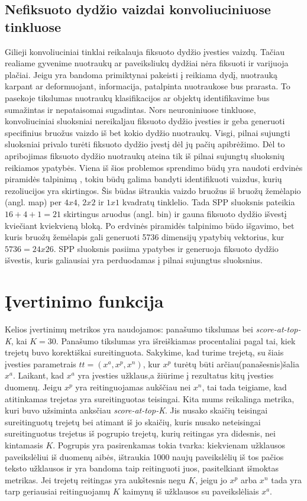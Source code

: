 \documentclass{VUMIFPSkursinis}
\DeclareRobustCommand{\[}{\begin{equation}}
\DeclareRobustCommand{\]}{\end{equation}}
\begin{document}
\subsection{Nefiksuoto dydžio vaizdai konvoliuciniuose tinkluose}
Gilieji konvoliuciniai tinklai reikalauja fiksuoto dydžio įvesties vaizdų. Tačiau realiame gyvenime nuotraukų ar paveiksliukų dydžiai nėra fiksuoti ir varijuoja plačiai.
\newline
Jeigu yra bandoma primiktynai pakeisti į reikiama dydį, nuotrauką karpant ar deformuojant, informacija, patalpinta nuotraukose bus prarasta. To pasekoje tikslumas nuotraukų klasifikacijos ar objektų identifikavime bus sumažintas ir nepataisomai sugadintas. Nors neuroniniuose tinkluose, konvoliuciniai sluoksniai nereikaljau fiksuoto dydžio įvesties ir geba generuoti specifinius bruožus vaizdo iš bet kokio dydžio nuotraukų. Visgi, pilnai sujungti sluoksniai privalo turėti fiksuoto dydžio įvestį dėl jų pačių apibrėžimo. Dėl to apribojimas fiksuoto dydžio nuotraukų ateina tik iš pilnai sujungtų sluoksnių reikiamos ypatybės.
Viena iš šios problemos sprendimo būdų yra naudoti erdvinės piramidės talpinimą \cite{Spatial_pyramid_pooling}, tokiu būdų galima bandyti identifikuoti vaizdus, kurių rezoliucijos yra skirtingos.
\newline
Šis būdas ištraukia vaizdo bruožus iš bruožų žemėlapio (angl. map) per $4 x 4$, $2 x 2$ ir $1 x 1$ kvadratų tinklelio. Tada SPP sluoksnis pateikia $16 + 4 + 1 = 21$ skirtingus aruodus (angl. bin) ir gauna fiksuoto dydžio išvestį kviečiant kviekvieną bloką. Po erdvinės piramidės talpinimo būdo išgavimo, bet kuris bruožų žemėlapis gali generuoti 5736 dimensijų ypatybių vektorius, kur $5736 = 24 x 26$. SPP sluoksnis pasiima ypatybes ir generuoja  fiksuoto dydžio išvestis, kuris galiausiai yra perduodamas į pilnai sujungtus sluoksnius.
\pagebreak

\section{Įvertinimo funkcija}
Kelios įvertinimų metrikos yra naudojamos: panašumo tikslumas bei \emph{score-at-top-K}, kai $K = 30$. Panašumo tikslumas yra išreiškiamas procentaliai pagal tai, kiek trejetų buvo korektiškai sureitinguota. Sakykime, kad turime trejetą, su šiais įvesties parametrais $tt = (x^a, x^p, x^n)$, kur $x^p$ turėtų būti arčiau(panašesnis)šalia $x^a$. Laikant, kad $x^a$ yra įvesties užklaus,a žiūrime į rezultatus kitų įvesties duomenų. Jeigu $x^p$ yra reitinguojamas aukščiau nei $x^n$, tai tada teigiame, kad atitinkamas trejetas yra sureitinguotas teisingai. Kita mums reikalinga metrika, kuri buvo užsiminta anksčiau \emph{score-at-top-K}. Jis nusako skaičių teisingai sureitinguotų trejetų bei atimant iš jo skaičių, kuris nusako neteisingai sureitinguotus trejetus iš pogrupio trejetų, kurių reitingas yra didesnis, nei kintamasis $K$. Pogrupis yra pasirenkamas tokia tvarka: kiekvienam užklausos paveikslėliui iš duomenų aibės, ištraukia 1000 naujų paveikslėlių iš tos pačios teksto užklausos ir yra bandoma taip reitinguoti juos, pasitelkiant išmoktas metrikas. Jei trejetų reitingas yra aukštesnis negu $K$, jeigu jo $x^p$ arba $x^n$ tada yra tarp geriausiai reitinguojamų $K$ kaimynų iš užklausos su paveikslėliais $x^a$.
\pagebreak
\end{document}
